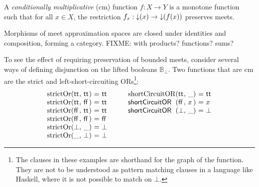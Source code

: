 \begin{definition}
  A \emph{conditionally multiplicative} (cm) function $f : X \to Y$ is
  a monotone function such that for all $x \in X$, the restriction
  $f_x : \mathop{\downarrow}(x) \to \mathop{\downarrow}(f(x))$ preserves meets.
\end{definition}

\begin{lemma}
  Morphisms of meet approximation spaces are closed under identities
  and composition, forming a category. FIXME: with products?
  functions? sums?
\end{lemma}

\begin{example}
  To see the effect of requiring preservation of bounded meets,
  consider several ways of defining disjunction on the lifted booleans
  $\mathbb{B}_\bot$. Two functions that are cm are the strict and
  left-short-circuiting ORs\footnote{The clauses in these examples are
    shorthand for the graph of the function. They are not to be
    understood as pattern matching clauses in a language like Haskell,
    where it is not possible to match on $\bot$.}:
  \begin{displaymath}
    \begin{array}[t]{l@{(}l@{,~}l@{)~}c@{~}l}
      \mathrm{strictOr}&\mathsf{tt}&\mathsf{tt}&=&\mathsf{tt} \\
      \mathrm{strictOr}&\mathsf{tt}&\mathsf{ff}&=&\mathsf{tt} \\
      \mathrm{strictOr}&\mathsf{ff}&\mathsf{tt}&=&\mathsf{tt} \\
      \mathrm{strictOr}&\mathsf{ff}&\mathsf{ff}&=&\mathsf{ff} \\
      \mathrm{strictOr}&\bot&\_&=&\bot \\
      \mathrm{strictOr}&\_&\bot&=&\bot \\
    \end{array}
    \qquad
    \begin{array}[t]{l@{(}l@{,~}l@{)~}c@{~}l}
      \mathrm{shortCircuitOR}&\mathsf{tt}&\_&=&\mathsf{tt} \\
      \mathsf{shortCircuitOR}&\mathsf{ff}&x&=&x \\
      \mathsf{shortCircuitOR}&\bot&\_& =& \bot
    \end{array}
  \end{displaymath}


\end{example}
